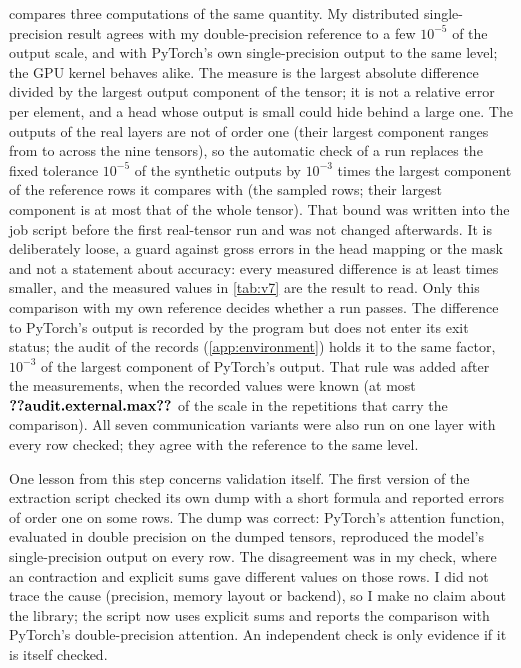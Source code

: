  compares three computations of the same quantity. My distributed
single-precision result agrees with my double-precision reference to a few
$10^{-5}$ of the output scale, and with PyTorch's own single-precision output to
the same level; the GPU kernel behaves alike. The measure is the largest absolute
difference divided by the largest output component of the tensor; it is not a
relative error per element, and a head whose output is small could hide behind a
large one. The outputs of the real layers are not of order one (their largest
component ranges from  to  across the nine
tensors), so the automatic check of a run replaces the fixed tolerance $10^{-5}$ of
the synthetic outputs by $10^{-3}$ times the largest component of the reference rows
it compares with (the  sampled rows; their largest component is at
most that of the whole tensor). That bound was written into the job script before
the first real-tensor run and was not changed afterwards. It is deliberately
loose, a guard against gross errors in the head mapping or the mask and not a
statement about accuracy: every measured difference is at least
 times smaller, and the measured values in \cref{tab:v7} are the
result to read. Only this comparison with my own reference decides whether a run
passes. The difference to PyTorch's output is recorded by the program but does not
enter its exit status; the audit of the records (\cref{app:environment}) holds it
to the same factor, $10^{-3}$ of the largest component of PyTorch's output. That
rule was added after the measurements, when the recorded values were known (at
most $\n{audit.external.max}$ of the scale in the 
repetitions that carry the comparison).
All seven communication variants were also run on one layer with every row
checked; they agree with the reference to the same level.

One lesson from this step concerns validation itself. The first version of the
extraction script checked its own dump with a short formula and reported errors of
order one on some rows. The dump was correct: PyTorch's attention function,
evaluated in double precision on the dumped tensors, reproduced the model's
single-precision output on every row. The disagreement was in my check, where an
 contraction and explicit sums gave different values on those rows. I
did not trace the cause (precision, memory layout or backend), so I make no claim
about the library; the script now uses explicit sums and reports the comparison
with PyTorch's double-precision attention. An independent check is only evidence
if it is itself checked.


